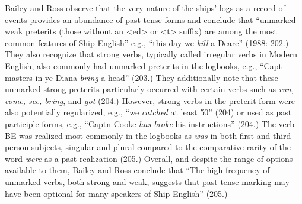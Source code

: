 Bailey and Ross observe that the very nature of the ships’ logs as a record of events provides an abundance of past tense forms and conclude that “unmarked weak preterits (those without an <ed> or <t> suffix) are among the most common features of Ship English” e.g., “this day we \textit{kill} a Deare” (1988: 202.) They also recognize that strong verbs, typically called irregular verbs in Modern English, also commonly had unmarked preterits in the logbooks, e.g., “Capt masters in ye Diana \textit{bring} a head” (203.) They additionally note that these unmarked strong preterits particularly occurred with certain verbs such as \textit{run, come, see, bring}, and \textit{got} (204.) However, strong verbs in the preterit form were also potentially regularized, e.g., “we \textit{catched} at least 50” (204) or used as past participle forms, e.g., “Captn Cooke \textit{has broke} his instructions” (204.) The verb BE was realized most commonly in the logbooks as \textit{was} in both first and third person subjects, singular and plural compared to the comparative rarity of the word \textit{were} as a past realization (205.) Overall, and despite the range of options available to them, Bailey and Ross conclude that “The high frequency of unmarked verbs, both strong and weak, suggests that past tense marking may have been optional for many speakers of Ship English” (205.) 

